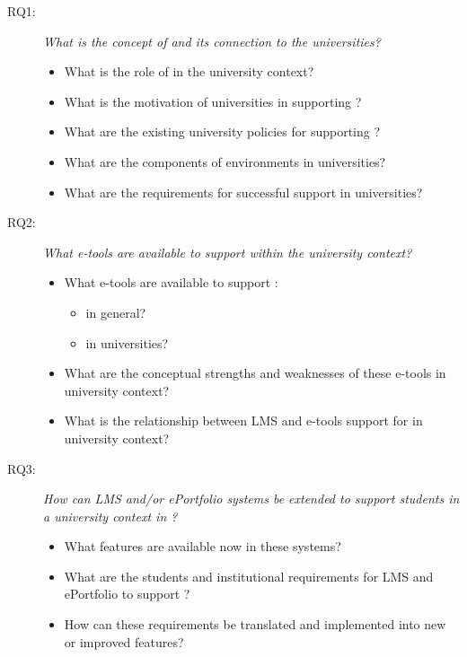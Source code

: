 \begin{description}
  \item[RQ1:] \textit{What is the concept of \LLLs and its connection to the
  universities?}
	\begin{itemize}
	  \item What is the role of \LLLs in the university context?
	  \item What is the motivation of universities in supporting \LLLsn?
  	  \item What are the existing university policies for supporting \LLLsn?
      \item What are the components of \LLLs environments in universities?
      \item What are the requirements for successful \LLLs support in
   universities?
	\end{itemize} 
	
   \item[RQ2:] \textit{What e-tools are available to support \LLLs within the
   university context?}
	\begin{itemize}
		\item What e-tools are available to support \LLLsn:
			\begin{itemize}
				\item in general?
				\item in universities?
			\end{itemize}
		\item What are the conceptual strengths and weaknesses of these e-tools in
university context?
		\item What is the relationship between LMS and e-tools support for \LLLs in
university context?
	\end{itemize}

	\item[RQ3:] \textit{How can LMS and/or ePortfolio systems be extended to
	support students in a university context in \LLLsn?}
	\begin{itemize}
		\item What features are available now in these systems?
		\item What are the students and institutional requirements for LMS and
		ePortfolio to support \LLLsn?
		\item How can these requirements be translated and implemented into new or
		improved features?
	\end{itemize}


\end{description}
